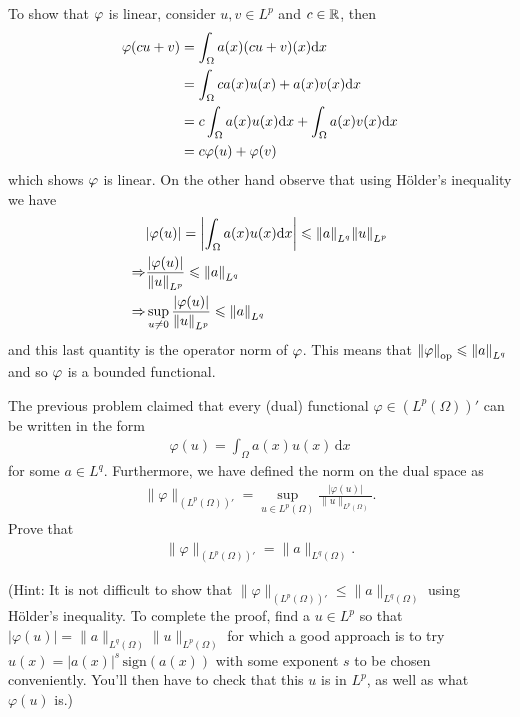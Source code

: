 \documentclass[12pt]{memoir}
\begin{document}
\begin{ptcbr}
  To show that $\varphi$ is linear, consider $u,v\in L^p$ and $c\in\mathbb{R}$, then 
  \begin{align*}
  \varphi(cu+v)&=\int_\Omega a(x)(cu+v)(x)\dd x\\
  &=\int_\Omega ca(x)u(x)+a(x)v(x)\dd x\\
  &=c\int_\Omega a(x)u(x)\dd x+\int_\Omega a(x)v(x)\dd x\\
  &=c\varphi(u)+\varphi(v)
  \end{align*}
  which shows $\varphi$ is linear. On the other hand observe that using H\"older's inequality we have 
\begin{align*}
  &|\varphi(u)|=\left|\int_\Omega a(x)u(x)\dd x\right|\leqslant\norm{a}_{L^q}\norm{u}_{L^p}\\
  \Rightarrow& \frac{|\varphi(u)|}{\norm{u}_{L^p}}\leqslant\norm{a}_{L^q}\\
  \Rightarrow&\sup_{u\neq 0}\frac{|\varphi(u)|}{\norm{u}_{L^p}}\leqslant\norm{a}_{L^q}
\end{align*}
  and this last quantity is the operator norm of $\varphi$. This means that $\norm{\varphi}_{\text{op}}\leqslant\norm{a}_{L^q}$ and so $\varphi$ is a bounded functional. 
\end{ptcbr}
\begin{Ej}
    The previous problem claimed that every (dual) functional $\varphi\in (L^p(\Omega))'$
can be written in the form
\begin{align*}
  \varphi(u) = \int_\Omega a(x) u(x) \, \text{d}x
\end{align*}
for some $a\in L^q$. Furthermore, we have defined the norm on the dual
space as
\begin{align*}
  \|\varphi\|_{(L^p(\Omega))'} =
  \sup_{u\in L^p(\Omega)} \frac{|\varphi(u)|}{\|u\|_{L^p(\Omega)}}.
\end{align*}
Prove that
\begin{align*}
  \|\varphi\|_{(L^p(\Omega))'} = \|a\|_{L^q(\Omega)}.
\end{align*}

(Hint: It is not difficult to show that $\|\varphi\|_{(L^p(\Omega))'}
\le \|a\|_{L^q(\Omega)}$ using H\"older's inequality. To complete the proof, find a $u\in L^p$ so
  that $|\varphi(u)|=\|a\|_{L^q(\Omega)}\|u\|_{L^p(\Omega)}$ for which
  a good approach is to try $u(x)=|a(x)|^s \,\text{sign}(a(x))$ with some exponent $s$ to
  be chosen conveniently. You'll then have to check that this $u$ is
  in $L^p$, as well as what $\varphi(u)$ is.)
\end{Ej}
\end{document}

